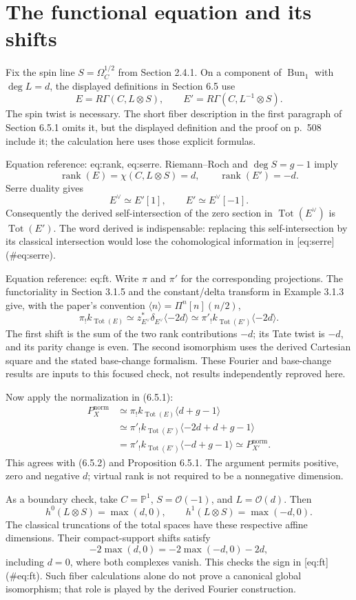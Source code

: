 \documentclass[10pt]{article}
\begin{document}
\section*{The functional equation and its shifts}
Fix the spin line \(S=\Omega_C^{1/2}\) from Section 2.4.1. On a component of \(\operatorname{Bun}_1\) with \(\deg L=d\), the displayed definitions in Section 6.5 use \[E=R\Gamma(C,L\otimes S),\qquad
 E'=R\Gamma(C,L^{-1}\otimes S).\] The spin twist is necessary. The short fiber description in the first paragraph of Section 6.5.1 omits it, but the displayed definition and the proof on p. 508 include it; the calculation here uses those explicit formulas.\par
Equation reference: eq:rank, eq:serre. Riemann–Roch and \(\deg S=g-1\) imply \[\operatorname{rank}(E)=\chi(C,L\otimes S)=d,\qquad
 \operatorname{rank}(E')=-d.
 \] Serre duality gives \[E^\vee\simeq E'[1],\qquad E'\simeq E^\vee[-1].
 \] Consequently the derived self-intersection of the zero section in \(\operatorname{Tot}(E^\vee)\) is \(\operatorname{Tot}(E')\). The word derived is indispensable: replacing this self-intersection by its classical intersection would lose the cohomological information in [eq:serre] (\#eq:serre).\par
Equation reference: eq:ft. Write \(\pi\) and \(\pi'\) for the corresponding projections. The functoriality in Section 3.1.5 and the constant/delta transform in Example 3.1.3 give, with the paper’s convention \(\langle n\rangle=\Pi^n[n](n/2)\), \[\pi_! k_{\operatorname{Tot}(E)}
 \simeq z_{E^\vee}^{*}\delta_{E^\vee}\langle-2d\rangle
 \simeq \pi'_! k_{\operatorname{Tot}(E')}\langle-2d\rangle.
 \] The first shift is the sum of the two rank contributions \(-d\); its Tate twist is \(-d\), and its parity change is even. The second isomorphism uses the derived Cartesian square and the stated base-change formalism. These Fourier and base-change results are inputs to this focused check, not results independently reproved here.\par
Now apply the normalization in (6.5.1): \[\begin{split}
 P_X^{\mathrm{norm}}
 &\simeq \pi_!k_{\operatorname{Tot}(E)}\langle d+g-1\rangle\\
 &\simeq \pi'_!k_{\operatorname{Tot}(E')}
       \langle-2d+d+g-1\rangle\\
 &=\pi'_!k_{\operatorname{Tot}(E')}
       \langle-d+g-1\rangle
 \simeq P_{X'}^{\mathrm{norm}}.
 \end{split}\] This agrees with (6.5.2) and Proposition 6.5.1. The argument permits positive, zero and negative \(d\); virtual rank is not required to be a nonnegative dimension.\par
As a boundary check, take \(C=\mathbb P^1\), \(S=\mathcal O(-1)\), and \(L=\mathcal O(d)\). Then \[h^0(L\otimes S)=\max(d,0),\qquad
 h^1(L\otimes S)=\max(-d,0).\] The classical truncations of the total spaces have these respective affine dimensions. Their compact-support shifts satisfy \[-2\max(d,0)=-2\max(-d,0)-2d,\] including \(d=0\), where both complexes vanish. This checks the sign in [eq:ft] (\#eq:ft). Such fiber calculations alone do not prove a canonical global isomorphism; that role is played by the derived Fourier construction.\par
\end{document}
